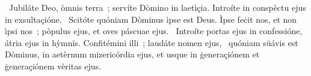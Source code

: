 ~Jubiláte Deo, òmnis terra~; servíte Dòmino in laetìçia. Introíte in conspèctu ejus in exsultaçióne. 
~Scitóte quóniam Dòminus ìpse est Deus. Ìpse feċit nos, et non ìpsi nos~; pòpulus ejus, et oves páscuae ejus. 
~Introíte portas ejus in confessióne, átria ejus in hỳmnïs. Confitémini illi~; laudáte nomen ejus, 
~quóniam süávis est Dòminus, in aetèrnum mizericórdia ejus, et usque in ġeneraçiónem et ġeneraçiónem vèritas ejus. 
